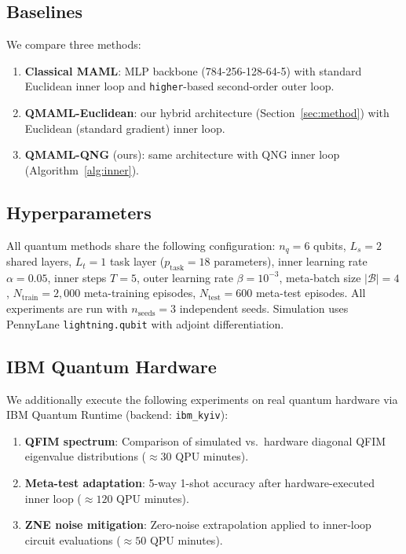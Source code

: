 \documentclass[a4paper,nopdfoutputerror]{quantumarticle}
\begin{document}
\subsection{Baselines}

We compare three methods:
\begin{enumerate}
  \item \textbf{Classical MAML}: MLP backbone (784-256-128-64-5) with
        standard Euclidean inner loop and \texttt{higher}-based second-order
        outer loop.
  \item \textbf{QMAML-Euclidean}: our hybrid architecture
        (Section~\ref{sec:method}) with Euclidean (standard gradient) inner loop.
  \item \textbf{QMAML-QNG} (ours): same architecture with QNG inner loop
        (Algorithm~\ref{alg:inner}).
\end{enumerate}

\subsection{Hyperparameters}

All quantum methods share the following configuration:
$n_q = 6$ qubits, $L_s = 2$ shared layers, $L_t = 1$ task layer
($p_{\mathrm{task}} = 18$ parameters),
inner learning rate $\alpha = 0.05$, inner steps $T = 5$,
outer learning rate $\beta = 10^{-3}$, meta-batch size $|\mathcal{B}| = 4$,
$N_{\mathrm{train}} = 2{,}000$ meta-training episodes,
$N_{\mathrm{test}} = 600$ meta-test episodes.
All experiments are run with $n_{\mathrm{seeds}} = 3$ independent seeds.
Simulation uses PennyLane \texttt{lightning.qubit} with adjoint
differentiation.

\subsection{IBM Quantum Hardware}

We additionally execute the following experiments on real quantum hardware
via IBM Quantum Runtime (backend: \texttt{ibm\_kyiv}):
\begin{enumerate}
  \item \textbf{QFIM spectrum}: Comparison of simulated vs.\ hardware
        diagonal QFIM eigenvalue distributions ($\approx 30$ QPU minutes).
  \item \textbf{Meta-test adaptation}: 5-way 1-shot accuracy after
        hardware-executed inner loop ($\approx 120$ QPU minutes).
  \item \textbf{ZNE noise mitigation}: Zero-noise extrapolation
        \cite{temme2017error,li2017efficient} applied to inner-loop
        circuit evaluations ($\approx 50$ QPU minutes).
\end{enumerate}
\end{document}
